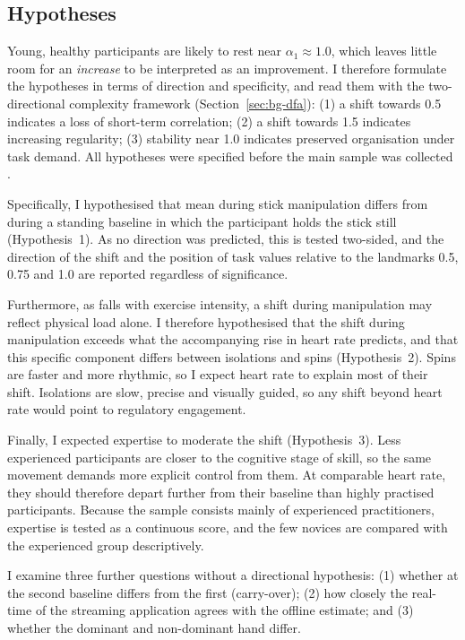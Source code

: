 \subsection{Hypotheses}
\label{sec:bg-hypotheses}

Young, healthy participants are likely to rest near $\alpha_1 \approx 1.0$, which leaves little room for an \emph{increase} to be interpreted as an improvement. I therefore formulate the hypotheses in terms of direction and specificity, and read them with the two-directional complexity framework (Section~\ref{sec:bg-dfa}): (1) a shift towards 0.5 indicates a loss of short-term correlation; (2) a shift towards 1.5 indicates increasing regularity; (3) stability near 1.0 indicates preserved organisation under task demand. All hypotheses were specified before the main sample was collected .

Specifically, I hypothesised that mean \al{} during stick manipulation differs from \al{} during a standing baseline in which the participant holds the stick still (Hypothesis~1). As no direction was predicted, this is tested two-sided, and the direction of the shift and the position of task values relative to the landmarks 0.5, 0.75 and 1.0 are reported regardless of significance.

Furthermore, as \al{} falls with exercise intensity, a shift during manipulation may reflect physical load alone. I therefore hypothesised that the shift during manipulation exceeds what the accompanying rise in heart rate predicts, and that this specific component differs between isolations and spins (Hypothesis~2). Spins are faster and more rhythmic, so I expect heart rate to explain most of their shift. Isolations are slow, precise and visually guided, so any shift beyond heart rate would point to regulatory engagement.

Finally, I expected expertise to moderate the shift (Hypothesis~3). Less experienced participants are closer to the cognitive stage of skill, so the same movement demands more explicit control from them. At comparable heart rate, they should therefore depart further from their baseline \al{} than highly practised participants. Because the sample consists mainly of experienced practitioners, expertise is tested as a continuous score, and the few novices are compared with the experienced group descriptively.

I examine three further questions without a directional hypothesis: (1) whether \al{} at the second baseline differs from the first (carry-over); (2) how closely the real-time \al{} of the streaming application agrees with the offline estimate; and (3) whether the dominant and non-dominant hand differ.
